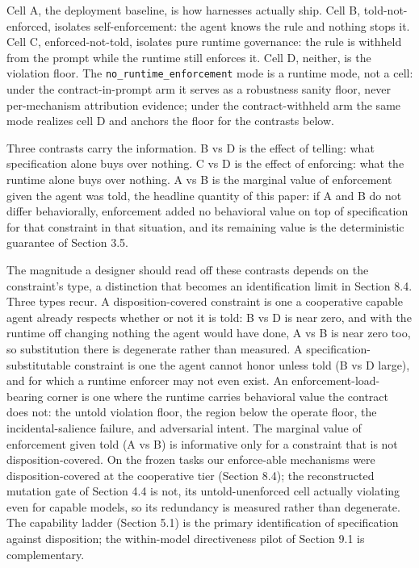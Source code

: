 \documentclass[
]{article}
\begin{document}
Cell A, the deployment baseline, is how harnesses actually ship. Cell B,
told-not-enforced, isolates self-enforcement: the agent knows the rule
and nothing stops it. Cell C, enforced-not-told, isolates pure runtime
governance: the rule is withheld from the prompt while the runtime still
enforces it. Cell D, neither, is the violation floor. The
\texttt{no\_runtime\_enforcement} mode is a runtime mode, not a cell:
under the contract-in-prompt arm it serves as a robustness sanity floor,
never per-mechanism attribution evidence; under the contract-withheld
arm the same mode realizes cell D and anchors the floor for the
contrasts below.

Three contrasts carry the information. B vs D is the effect of telling:
what specification alone buys over nothing. C vs D is the effect of
enforcing: what the runtime alone buys over nothing. A vs B is the
marginal value of enforcement given the agent was told, the headline
quantity of this paper: if A and B do not differ behaviorally,
enforcement added no behavioral value on top of specification for that
constraint in that situation, and its remaining value is the
deterministic guarantee of Section 3.5.

The magnitude a designer should read off these contrasts depends on the
constraint's type, a distinction that becomes an identification limit in
Section 8.4. Three types recur. A disposition-covered constraint is one
a cooperative capable agent already respects whether or not it is told:
B vs D is near zero, and with the runtime off changing nothing the agent
would have done, A vs B is near zero too, so substitution there is
degenerate rather than measured. A specification-substitutable
constraint is one the agent cannot honor unless told (B vs D large), and
for which a runtime enforcer may not even exist. An
enforcement-load-bearing corner is one where the runtime carries
behavioral value the contract does not: the untold violation floor, the
region below the operate floor, the incidental-salience failure, and
adversarial intent. The marginal value of enforcement given told (A vs
B) is informative only for a constraint that is not disposition-covered.
On the frozen tasks our enforce-able mechanisms were disposition-covered
at the cooperative tier (Section 8.4); the reconstructed mutation gate
of Section 4.4 is not, its untold-unenforced cell actually violating
even for capable models, so its redundancy is measured rather than
degenerate. The capability ladder (Section 5.1) is the primary
identification of specification against disposition; the within-model
directiveness pilot of Section 9.1 is complementary.
\end{document}

